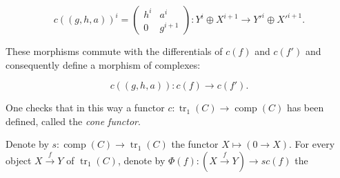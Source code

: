 \begin{equation}
  c((g,h,a))^i=
  \begin{pmatrix}
    h^i & a^i\\
    0 & g^{i+1}
  \end{pmatrix}
  \colon Y^i\oplus X^{i+1}\longrightarrow Y'^i\oplus X'^{i+1}.
  \tag{3.1.2.2}
\end{equation}

These morphisms commute with the differentials of $c(f)$ and $c(f')$ and
consequently define a morphism of complexes:

\begin{equation}
  c((g,h,a))\colon c(f)\longrightarrow c(f').
  \tag{3.1.2.3}
\end{equation}

One checks that in this way a functor
$c\colon\operatorname{tr}_1(C)\longrightarrow\operatorname{comp}(C)$
has been defined, called the \emph{cone functor}.

Denote by
$s\colon\operatorname{comp}(C)\longrightarrow\operatorname{tr}_1(C)$
the functor $X\longmapsto(0\longrightarrow X)$.
For every object $X\xrightarrow{f}Y$ of $\operatorname{tr}_1(C)$, denote by
$\Phi(f)\colon(X\xrightarrow{f}Y)\longrightarrow s c(f)$ the
